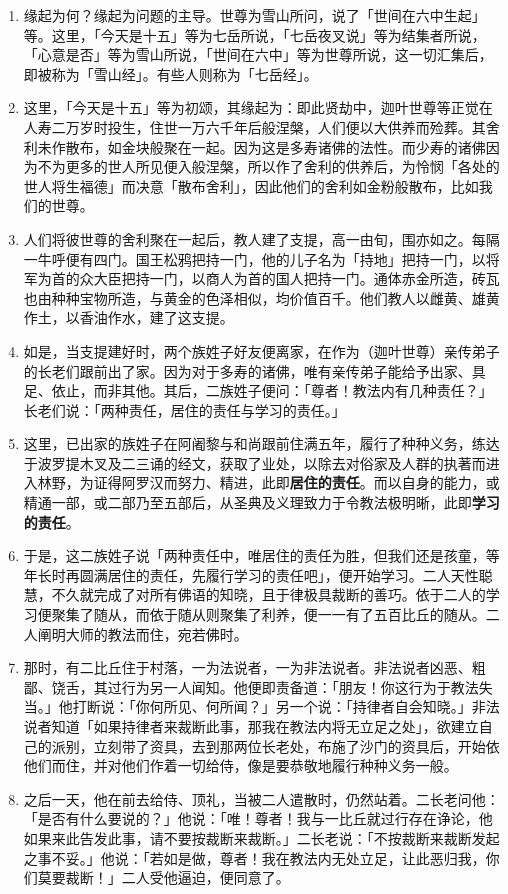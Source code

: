 \begin{enumerate}\item 缘起为何？缘起为问题的主导。世尊为雪山所问，说了「世间在六中生起」等。这里，「今天是十五」等为七岳所说，「七岳夜叉说」等为结集者所说，「心意是否」等为雪山所说，「世间在六中」等为世尊所说，这一切汇集后，即被称为「雪山经」。有些人则称为「七岳经」。
\item 这里，「今天是十五」等为初颂，其缘起为：即此贤劫中，迦叶世尊等正觉在人寿二万岁时投生，住世一万六千年后般涅槃，人们便以大供养而殓葬。其舍利未作散布，如金块般聚在一起。因为这是多寿诸佛的法性。而少寿的诸佛因为不为更多的世人所见便入般涅槃，所以作了舍利的供养后，为怜悯「各处的世人将生福德」而决意「散布舍利」，因此他们的舍利如金粉般散布，比如我们的世尊。
\item 人们将彼世尊的舍利聚在一起后，教人建了支提，高一由旬，围亦如之。每隔一牛呼便有四门。国王松鸦把持一门，他的儿子名为「持地」把持一门，以将军为首的众大臣把持一门，以商人为首的国人把持一门。通体赤金所造，砖瓦也由种种宝物所造，与黄金的色泽相似，均价值百千。他们教人以雌黄、雄黄作土，以香油作水，建了这支提。
\item 如是，当支提建好时，两个族姓子好友便离家，在作为（迦叶世尊）亲传弟子的长老们跟前出了家。因为对于多寿的诸佛，唯有亲传弟子能给予出家、具足、依止，而非其他。其后，二族姓子便问：「尊者！教法内有几种责任？」长老们说：「两种责任，居住的责任与学习的责任。」
\item 这里，已出家的族姓子在阿阇黎与和尚跟前住满五年，履行了种种义务，练达于波罗提木叉及二三诵的经文，获取了业处，以除去对俗家及人群的执著而进入林野，为证得阿罗汉而努力、精进，此即\textbf{居住的责任}。而以自身的能力，或精通一部，或二部乃至五部后，从圣典及义理致力于令教法极明晰，此即\textbf{学习的责任}。
\item 于是，这二族姓子说「两种责任中，唯居住的责任为胜，但我们还是孩童，等年长时再圆满居住的责任，先履行学习的责任吧」，便开始学习。二人天性聪慧，不久就完成了对所有佛语的知晓，且于律极具裁断的善巧。依于二人的学习便聚集了随从，而依于随从则聚集了利养，便一一有了五百比丘的随从。二人阐明大师的教法而住，宛若佛时。
\item 那时，有二比丘住于村落，一为法说者，一为非法说者。非法说者凶恶、粗鄙、饶舌，其过行为另一人闻知。他便即责备道：「朋友！你这行为于教法失当。」他打断说：「你何所见、何所闻？」另一个说：「持律者自会知晓。」非法说者知道「如果持律者来裁断此事，那我在教法内将无立足之处」，欲建立自己的派别，立刻带了资具，去到那两位长老处，布施了沙门的资具后，开始依他们而住，并对他们作着一切给侍，像是要恭敬地履行种种义务一般。
\item 之后一天，他在前去给侍、顶礼，当被二人遣散时，仍然站着。二长老问他：「是否有什么要说的？」他说：「唯！尊者！我与一比丘就过行存在诤论，他如果来此告发此事，请不要按裁断来裁断。」二长老说：「不按裁断来裁断发起之事不妥。」他说：「若如是做，尊者！我在教法内无处立足，让此恶归我，你们莫要裁断！」二人受他逼迫，便同意了。

\end{enumerate}
